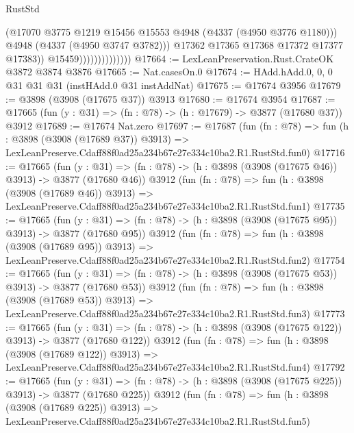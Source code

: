 \begin{lexlean}{RustStd}
\begin{coremodule}
                                      (@17070
                                        @3775
                                        @1219
                                        @15456
                                        @15553
                                        @4948
                                        (@4337 (@4950 @3776 @1180)))
                                      @4948
                                      (@4337 (@4950 @3747 @3782)))
                                    @17362
                                    @17365
                                    @17368
                                    @17372
                                    @17377
                                    @17383))
                                @15459))))))))))))))
@17664 := LexLeanPreservation.Rust.CrateOK @3872 @3874 @3876
@17665 := Nat.casesOn.{0}
@17674 := HAdd.hAdd.{0, 0, 0} @31 @31 @31 (instHAdd.{0} @31 instAddNat)
@17675 := @17674 @3956
@17679 := @3898 (@3908 (@17675 @37)) @3913
@17680 := @17674 @3954
@17687 := @17665 (fun (y : @31) => (fn : @78) -> (h : @17679) -> @3877 (@17680 @37)) @3912
@17689 := @17674 Nat.zero
@17697 := @17687
    (fun (fn : @78) =>
    fun (h : @3898 (@3908 (@17689 @37)) @3913) =>
    LexLeanPreserve.Cdaff88f0ad25a234b67e27e334c10ba2.R1.RustStd.fun0)
@17716 := @17665
    (fun (y : @31) => (fn : @78) -> (h : @3898 (@3908 (@17675 @46)) @3913) -> @3877 (@17680 @46))
    @3912
    (fun (fn : @78) =>
    fun (h : @3898 (@3908 (@17689 @46)) @3913) =>
    LexLeanPreserve.Cdaff88f0ad25a234b67e27e334c10ba2.R1.RustStd.fun1)
@17735 := @17665
    (fun (y : @31) => (fn : @78) -> (h : @3898 (@3908 (@17675 @95)) @3913) -> @3877 (@17680 @95))
    @3912
    (fun (fn : @78) =>
    fun (h : @3898 (@3908 (@17689 @95)) @3913) =>
    LexLeanPreserve.Cdaff88f0ad25a234b67e27e334c10ba2.R1.RustStd.fun2)
@17754 := @17665
    (fun (y : @31) => (fn : @78) -> (h : @3898 (@3908 (@17675 @53)) @3913) -> @3877 (@17680 @53))
    @3912
    (fun (fn : @78) =>
    fun (h : @3898 (@3908 (@17689 @53)) @3913) =>
    LexLeanPreserve.Cdaff88f0ad25a234b67e27e334c10ba2.R1.RustStd.fun3)
@17773 := @17665
    (fun (y : @31) => (fn : @78) -> (h : @3898 (@3908 (@17675 @122)) @3913) -> @3877 (@17680 @122))
    @3912
    (fun (fn : @78) =>
    fun (h : @3898 (@3908 (@17689 @122)) @3913) =>
    LexLeanPreserve.Cdaff88f0ad25a234b67e27e334c10ba2.R1.RustStd.fun4)
@17792 := @17665
    (fun (y : @31) => (fn : @78) -> (h : @3898 (@3908 (@17675 @225)) @3913) -> @3877 (@17680 @225))
    @3912
    (fun (fn : @78) =>
    fun (h : @3898 (@3908 (@17689 @225)) @3913) =>
    LexLeanPreserve.Cdaff88f0ad25a234b67e27e334c10ba2.R1.RustStd.fun5)

\end{coremodule}
\end{lexlean}
